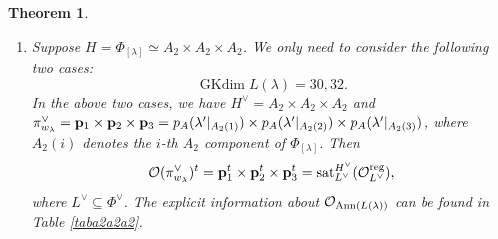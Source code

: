\documentclass[reqno,12pt]{amsart}
\numberwithin{equation}{section}
\theoremstyle{plain}
\newtheorem{Thm}{Theorem}[section]
\theoremstyle{definition}
\newcommand{\lam}{\lambda}
\newcommand{\Ann}{\mathrm{Ann}}
\renewcommand{\subset}{\subseteq}
\newcommand{\gkd}{\operatorname{GKdim}}
\begin{document}
\begin{Thm}
\begin{enumerate}






  \item Suppose $H=\Phi_{[\lam]}\simeq A_2\times A_2\times A_2$. 
We only need to consider the following two cases:
$$\gkd L(\lam)=30, 32.$$
In the above two cases, we have $H^{\vee}=A_2\times A_2\times A_2$ and   
$\pi^{\vee}_{w_{\lam}}={\bf p}_{1}\times {\bf p}_{2}\times {\bf p}_{3}=p_{A}(\lam'|_{A_2(1)})\times p_{A}(\lam'|_{{A}_2(2)}) \times p_{A}(\lam'|_{{A}_2(3)})$, where $A_2(i)$ denotes the $i$-th $A_2$ component  of $\Phi_{[\lam]}$. Then $$\mathcal{O}(\pi^{\vee}_{w_{\lam}})^t={\bf p}^t_{1}\times {\bf p}^t_{2}\times {\bf p}^t_{3} = {\rm sat}_{L^\vee}^{H^\vee} (\mathcal{O}_{L^\vee}^{\rm reg}),$$
where $L^\vee \subset \Phi^\vee$. The explicit information about $\mathcal{O}_{{\rm Ann}(L(\lambda))}$ can be found in Table \ref{taba2a2a2}.



            



\end{enumerate}
\end{Thm}
\end{document}
